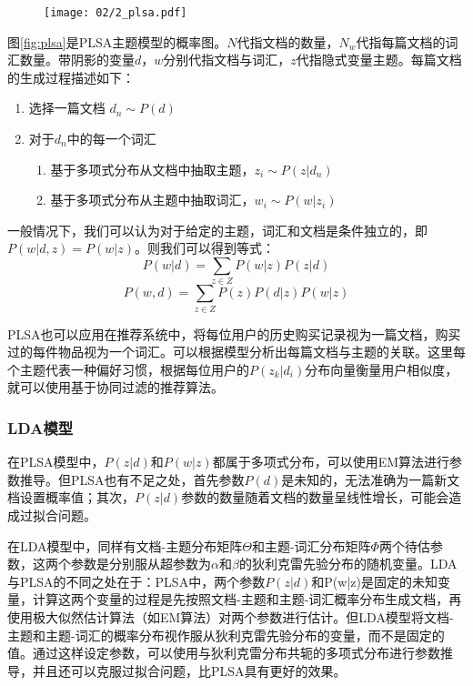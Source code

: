 \begin{figure}
 \centering
 \texttt{[image: 02/2\_plsa.pdf]}
\end{figure}

图\ref{fig:plsa}是PLSA主题模型的概率图。$N$代指文档的数量，$N_w$代指每篇文档的词汇数量。带阴影的变量$d$，$w$分别代指文档与词汇，$z$代指隐式变量主题。每篇文档的生成过程描述如下：

\begin{enumerate}
\item 选择一篇文档 $d_n \sim P(d)$
\item 对于$d_n$中的每一个词汇
       \begin{enumerate}[fullwidth,itemindent=1em,label=(\alph*)]
       \item 基于多项式分布从文档中抽取主题，$z_i \sim P(z|d_n)$
       \item 基于多项式分布从主题中抽取词汇，$w_i \sim P(w|z_i)$
       \end{enumerate}
\end{enumerate}

一般情况下，我们可以认为对于给定的主题，词汇和文档是条件独立的，即$P(w|d,z) = P(w|z)$。则我们可以得到等式：
\begin{equation}
	P(w|d) = \sum_{z\in Z}P(w|z)P(z|d)
\end{equation}
\begin{equation}
	P(w,d) = \sum_{z\in Z}P(z)P(d|z)P(w|z)
\end{equation}

PLSA也可以应用在推荐系统中，将每位用户的历史购买记录视为一篇文档，购买过的每件物品视为一个词汇。可以根据模型分析出每篇文档与主题的关联。这里每个主题代表一种偏好习惯，根据每位用户的$P(z_k|d_i)$分布向量衡量用户相似度，就可以使用基于协同过滤的推荐算法。

\subsubsection{LDA模型}

在PLSA模型中，$P(z|d)$和$P(w|z)$都属于多项式分布，可以使用EM算法进行参数推导。但PLSA也有不足之处，首先参数$P(d)$是未知的，无法准确为一篇新文档设置概率值；其次，$P(z|d)$参数的数量随着文档的数量呈线性增长，可能会造成过拟合问题。

在LDA\cite{blei2003latent}模型中，同样有文档-主题分布矩阵$\Theta$和主题-词汇分布矩阵$\Phi$两个待估参数，这两个参数是分别服从超参数为$\alpha$和$\beta$的狄利克雷先验分布的随机变量。LDA与PLSA的不同之处在于：PLSA中，两个参数$P(z|d)$和P(w|z)是固定的未知变量，计算这两个变量的过程是先按照文档-主题和主题-词汇概率分布生成文档，再使用极大似然估计算法（如EM算法）对两个参数进行估计。但LDA模型将文档-主题和主题-词汇的概率分布视作服从狄利克雷先验分布的变量，而不是固定的值。通过这样设定参数，可以使用与狄利克雷分布共轭的多项式分布进行参数推导，并且还可以克服过拟合问题，比PLSA具有更好的效果。

